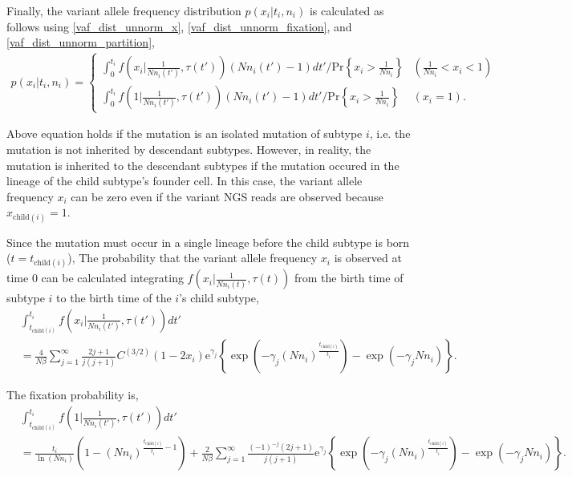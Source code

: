 \documentclass[12pt]{article}
\begin{document}
Finally, the variant allele frequency distribution $p(x_i | t_i, n_i)$ is calculated as follows using \eqref{vaf_dist_unnorm_x}, \eqref{vaf_dist_unnorm_fixation}, and \eqref{vaf_dist_unnorm_partition},
\begin{align}
 p(x_i | t_i, n_i) = \begin{cases}
                      \int_{0}^{t_i} f\left(x_i\Big|\frac{1}{Nn_i(t')}, \tau(t')\right) (Nn_i(t') - 1) dt' \bigg/ \mathrm{Pr}\left\{ x_i > \frac{1}{Nn_i}\right\} & \left(\frac{1}{Nn_i} < x_i < 1\right)\\
                      \int_{0}^{t_i} f\left(1\Big|\frac{1}{Nn_i(t')}, \tau(t')\right) (Nn_i(t') - 1) dt' \bigg/ \mathrm{Pr}\left\{ x_i > \frac{1}{Nn_i}\right\} & \left(x_i = 1\right).
                     \end{cases}
\end{align}

Above equation holds if the mutation is an isolated mutation of subtype $i$, i.e. the mutation is not inherited by descendant subtypes.
However, in reality, the mutation is inherited to the descendant subtypes if the mutation occured in the lineage of the child subtype's founder cell.
In this case, the variant allele frequency $x_i$ can be zero even if the variant NGS reads are observed because $x_{\mathrm{child}(i)} = 1$.

Since the mutation must occur in a single lineage before the child subtype is born ($t = t_{\mathrm{child}(i)}$),
The probability that the variant allele frequency $x_i$ is observed at time 0 can be calculated integrating $f\left(x_i| \frac{1}{Nn_i(t)}, \tau(t)\right)$ from the birth time of subtype $i$ to the birth time of the $i$'s child subtype,
\begin{align}
 & \int_{t_{\mathrm{child}(i)}}^{t_i} f\left(x_i\Big|\frac{1}{Nn_i(t')}, \tau(t')\right) dt'\nonumber\\
 & = \frac{4}{N\beta} \sum_{j=1}^{\infty} \frac{2j+1}{j(j+1)} C^{(3/2)}(1-2x_i)
 \mathrm{e}^{\gamma_j} \left\{ \exp\left(-\gamma_j\left(Nn_i\right)^{\frac{t_{\mathrm{child}(i)}}{t_i}}\right) - \exp(-\gamma_j Nn_i)\right\}.\label{vaf_dist_unnorm_inherited_x}
\end{align}

The fixation probability is,
\begin{align}
 & \int_{t_{\mathrm{child}(i)}}^{t_i} f\left(1\Big|\frac{1}{Nn_i(t')}, \tau(t')\right) dt'\nonumber\\
 & = \frac{t_i}{\ln(Nn_i)}\left(1 - (Nn_i)^{\frac{t_{\mathrm{child}(i)}}{t_i} - 1}\right)
 + \frac{2}{N\beta} \sum_{j=1}^{\infty} \frac{(-1)^{-j}(2j+1)}{j(j+1)}
 \mathrm{e}^{\gamma_j} \left\{ \exp\left(-\gamma_j\left(Nn_i\right)^{\frac{t_{\mathrm{child}(i)}}{t_i}}\right) - \exp(-\gamma_j Nn_i)\right\}.\label{vaf_dist_unnorm_inherited_fixation}
\end{align}
\end{document}
